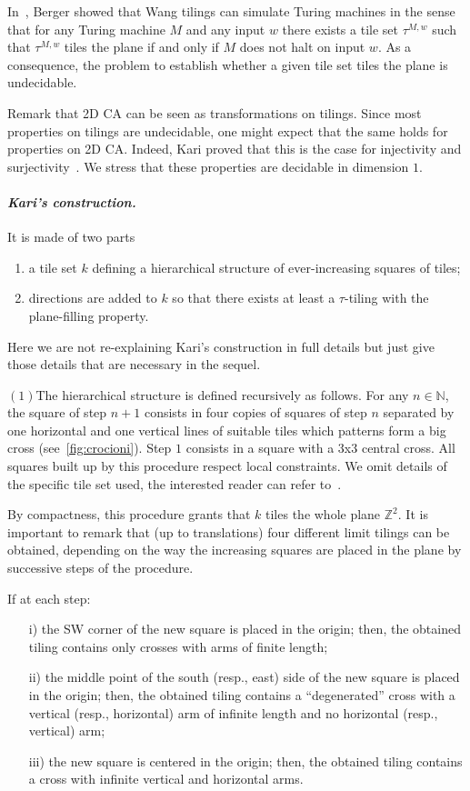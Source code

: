 \documentclass{llncs}
\newcommand{\z}{\ensuremath{\mathbb{Z}}\xspace}
\newcommand{\n}{\ensuremath{\mathbb{N}}\xspace}
\begin{document}
In~\cite{B66}, Berger showed that Wang tilings can simulate
Turing machines in the sense that for any Turing machine $M$ and
any input $w$ there exists a tile set $\tau^{M,w}$ such that
$\tau^{M,w}$ tiles the plane if and only if $M$ does not halt on
input $w$. As a consequence, the problem
to establish whether a given tile set tiles the plane is undecidable. 

Remark that 2D CA can be seen as transformations on tilings.
Since most properties on tilings are undecidable, one might expect
that the same holds for properties on 2D CA. 
Indeed, Kari proved that this is the case for injectivity 
and surjectivity~\cite{kari94a}. We stress that these properties are decidable in dimension $1$.


\paragraph{\emph{Kari's construction.}} It is made of two parts
\begin{enumerate}
\item a tile set $k$ defining a hierarchical structure of ever-increasing squares of tiles;
\item directions are added to $k$ so that
there exists at least a $\tau$-tiling with the plane-filling property.
\end{enumerate}
\smallskip

Here we are not re-explaining Kari's construction in full details but just
give those details that are necessary in the sequel.
\smallskip

\noindent$(1)$\quad The hierarchical structure is defined recursively as follows.
For any $n\in\n$, the square of step $n+1$ consists in four copies
of squares of step $n$ separated by one horizontal and one vertical lines of suitable tiles which patterns form a big cross (see~\ref{fig:crocioni}).
Step $1$ consists in a square with a 3x3 central cross. All squares built up by this procedure respect local constraints. We omit details of
the specific tile set used, the interested reader can refer 
to~\cite{kari94a}. 

By compactness, this procedure grants that $k$ tiles the whole
plane $\z^2$. It is important to remark that (up to
translations) four different limit tilings can be obtained, depending on
the way the increasing squares are placed in the plane by
successive steps of the procedure.  

If at each step:
\begin{enumerate}
\item[i)] the SW corner of the new square is placed in the origin; then,
the obtained tiling contains only crosses with arms of finite length;
\item[ii)] the middle point of the south (resp., east) side of the new square is placed  in the origin; then, the obtained tiling contains a ``degenerated'' cross with a vertical (resp., horizontal) arm of infinite length and no horizontal (resp., vertical) arm;
\item[iii)] the new square is centered in the origin; then, the obtained tiling contains a cross with infinite vertical and horizontal arms. 
\end{enumerate}
\end{document}
